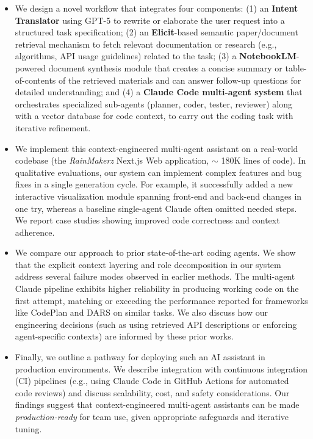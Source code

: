\documentclass[11pt]{article}
\begin{document}
\begin{itemize}
\item We design a novel workflow that integrates four components: (1) an \textbf{Intent Translator} using GPT-5 to rewrite or elaborate the user request into a structured task specification; (2) an \textbf{Elicit}-based semantic paper/document retrieval mechanism to fetch relevant documentation or research (e.g., algorithms, API usage guidelines) related to the task; (3) a \textbf{NotebookLM}-powered document synthesis module that creates a concise summary or table-of-contents of the retrieved materials and can answer follow-up questions for detailed understanding; and (4) a \textbf{Claude Code multi-agent system} that orchestrates specialized sub-agents (planner, coder, tester, reviewer) along with a vector database for code context, to carry out the coding task with iterative refinement.
\item We implement this context-engineered multi-agent assistant on a real-world codebase (the \textit{RainMakerz} Next.js Web application, $\sim$ 180K lines of code). In qualitative evaluations, our system can implement complex features and bug fixes in a single generation cycle. For example, it successfully added a new interactive visualization module spanning front-end and back-end changes in one try, whereas a baseline single-agent Claude often omitted needed steps. We report case studies showing improved code correctness and context adherence.
\item We compare our approach to prior state-of-the-art coding agents. We show that the explicit context layering and role decomposition in our system address several failure modes observed in earlier methods. The multi-agent Claude pipeline exhibits higher reliability in producing working code on the first attempt, matching or exceeding the performance reported for frameworks like CodePlan \cite{codeplan2025} and DARS \cite{dars2025} on similar tasks. We also discuss how our engineering decisions (such as using retrieved API descriptions or enforcing agent-specific contexts) are informed by these prior works.
\item Finally, we outline a pathway for deploying such an AI assistant in production environments. We describe integration with continuous integration (CI) pipelines (e.g., using Claude Code in GitHub Actions for automated code reviews) and discuss scalability, cost, and safety considerations. Our findings suggest that context-engineered multi-agent assistants can be made \textit{production-ready} for team use, given appropriate safeguards and iterative tuning.
\end{itemize}
\end{document}
